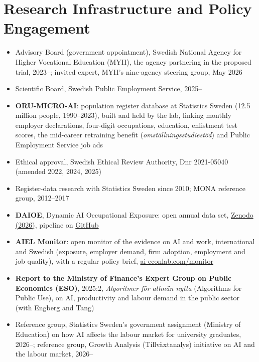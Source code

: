\documentclass[11pt,a4paper]{article}
\newcommand{\cventry}[1]{\item #1}
\begin{document}
\section{Research Infrastructure and Policy Engagement}
\vspace{-2pt}
\begin{itemize}
 \cventry{Advisory Board (government appointment), Swedish National Agency for Higher Vocational Education (MYH), the agency partnering in the proposed trial, 2023--; invited expert, MYH's nine-agency steering group, May 2026}
 \cventry{Scientific Board, Swedish Public Employment Service, 2025--}
 \cventry{\textbf{ORU-MICRO-AI}: population register database at Statistics Sweden (12.5 million people, 1990--2023), built and held by the lab, linking monthly employer declarations, four-digit occupations, education, enlistment test scores, the mid-career retraining benefit (\textit{omställningsstudiestöd}) and Public Employment Service job ads}
 \cventry{Ethical approval, Swedish Ethical Review Authority, Dnr 2021-05040 (amended 2022, 2024, 2025)} %
 \cventry{Register-data research with Statistics Sweden since 2010; MONA reference group, 2012--2017}
 \cventry{\textbf{DAIOE}, Dynamic AI Occupational Exposure: open annual data set, \href{https://doi.org/10.5281/zenodo.21873968}{Zenodo (2026)}, pipeline on \href{https://github.com/Magnus-L/daioe-pipeline}{GitHub}}
 \cventry{\textbf{AIEL Monitor}: open monitor of the evidence on AI and work, international and Swedish (exposure, employer demand, firm adoption, employment and job quality), with a regular policy brief, \href{https://ai-econlab.com/monitor/}{ai-econlab.com/monitor}}
 \cventry{\textbf{Report to the Ministry of Finance's Expert Group on Public Economics (ESO)}, 2025:2, \textit{Algoritmer för allmän nytta} (Algorithms for Public Use), on AI, productivity and labour demand in the public sector (with Engberg and Tang)}
 \cventry{Reference group, Statistics Sweden's government assignment (Ministry of Education) on how AI affects the labour market for university graduates, 2026--; reference group, Growth Analysis (Tillv\"axtanalys) initiative on AI and the labour market, 2026--}
\end{itemize}

\end{document}
